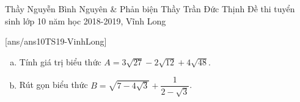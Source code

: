 \begin{name}
{Thầy Nguyễn Bình Nguyên \& Phản biện Thầy Trần Đức Thịnh}
{Đề thi tuyển sinh lớp 10 năm học 2018-2019, Vĩnh Long}
\end{name}
\setcounter{ex}{0}
[ans/ans10TS19-VinhLong]
\begin{ex}%
	\begin{enumerate}[a)]
		\item Tính giá trị biểu thức $A=3\sqrt{27}-2\sqrt{12}+4\sqrt{48}$. 
		\item Rút gọn biểu thức $B=\sqrt{7-4\sqrt{3}}+\dfrac{1}{2-\sqrt{3}}$.
	\end{enumerate}
\end{ex}
